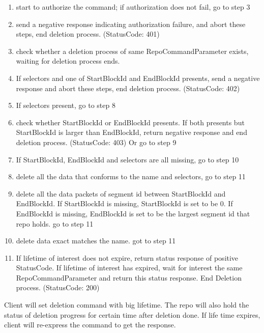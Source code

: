 \documentclass{acm_proc_article-sp}
\begin{document}
\begin{enumerate}

\item start to authorize the command; if authorization does not fail, go to step 3

\item send a negative response indicating authorization failure, and abort these steps, end deletion process. (StatusCode: 401)

\item check whether a deletion process of same RepoCommandParameter exists, waiting for deletion process ends.

\item If selectors and one of StartBlockId and EndBlockId presents, send a negative response and abort these steps, end deletion process. (StatusCode: 402)

\item If selectors present, go to step 8

\item check whether StartBlockId or EndBlockId presents. If both presents but StartBlockId is larger than EndBlockId, return negative response and end deletion process. (StatusCode: 403) Or go to step 9

\item If StartBlockId, EndBlockId and selectors are all missing, go to step 10

\item delete all the data that conforms to the name and selectors, go to step 11

\item delete all the data packets of segment id between StartBlockId and EndBlockId. If StartBlockId is missing, StartBlockId is set to be 0. If EndBlockId is missing, EndBlockId is set to be the largest segment id that repo holds. go to step 11

\item delete data exact matches the name. got to step 11

\item If lifetime of interest does not expire, return status response of positive StatusCode. If lifetime of interest has expired, wait for interest the same RepoCommandParameter and return this status response. End Deletion process. (StatusCode: 200)

\end{enumerate}

Client will set deletion command with big lifetime. The repo will also hold the status of deletion progress for certain time after deletion done. If life time expires, client will re-express the command to get the response.
\end{document}
